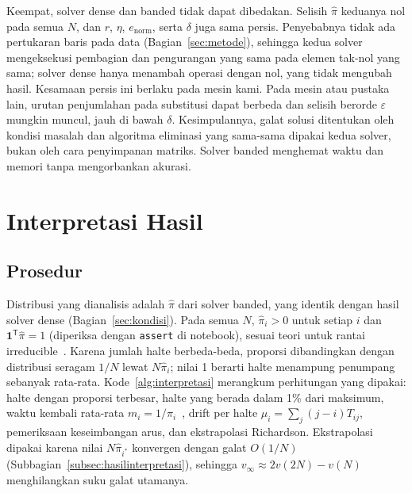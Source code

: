 \documentclass[12pt,a4paper]{article}
\newcommand{\T}{\mathsf{T}}
\numberwithin{equation}{section}
\begin{document}
Keempat, solver dense dan banded tidak dapat dibedakan. Selisih $\hat\pi$ keduanya nol pada semua $N$, dan $r$, $\eta$,
$e_{\mathrm{norm}}$, serta $\delta$ juga sama persis. Penyebabnya tidak ada pertukaran baris pada data
(Bagian~\ref{sec:metode}), sehingga kedua solver mengeksekusi pembagian dan pengurangan yang sama pada elemen tak-nol
yang sama; solver dense hanya menambah operasi dengan nol, yang tidak mengubah hasil. Kesamaan persis ini berlaku pada
mesin kami. Pada mesin atau pustaka lain, urutan penjumlahan pada substitusi dapat berbeda dan selisih berorde
$\varepsilon$ mungkin muncul, jauh di bawah $\delta$. Kesimpulannya, galat solusi ditentukan oleh kondisi masalah dan
algoritma eliminasi yang sama-sama dipakai kedua solver, bukan oleh cara penyimpanan matriks. Solver banded menghemat
waktu dan memori tanpa mengorbankan akurasi.

\section{Interpretasi Hasil}\label{sec:interpretasi}

\subsection{Prosedur}
Distribusi yang dianalisis adalah $\hat\pi$ dari solver banded, yang identik dengan hasil solver dense
(Bagian~\ref{sec:kondisi}). Pada semua $N$, $\hat\pi_i>0$ untuk setiap $i$ dan $\mathbf1^\T\hat\pi=1$ (diperiksa dengan
\texttt{assert} di notebook), sesuai teori untuk rantai irreducible~\cite{norris}. Karena jumlah halte berbeda-beda,
proporsi dibandingkan dengan distribusi seragam $1/N$ lewat $N\hat\pi_i$; nilai 1 berarti halte menampung penumpang
sebanyak rata-rata. Kode~\ref{alg:interpretasi} merangkum perhitungan yang dipakai: halte dengan proporsi terbesar,
halte yang berada dalam 1\% dari maksimum, waktu kembali rata-rata $m_i=1/\pi_i$~\cite{norris}, drift per halte
$\mu_i=\sum_j(j-i)T_{ij}$, pemeriksaan keseimbangan arus, dan ekstrapolasi Richardson. Ekstrapolasi dipakai karena
nilai $N\hat\pi_{i^\ast}$ konvergen dengan galat $O(1/N)$ (Subbagian~\ref{subsec:hasilinterpretasi}), sehingga
$v_\infty\approx2v(2N)-v(N)$ menghilangkan suku galat utamanya.
\end{document}
